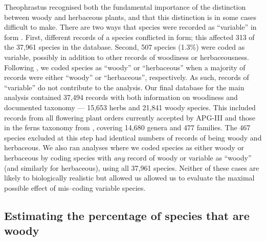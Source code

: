 \documentclass[a4paper,12pt]{article}
\begin{document}
Theophrastus recognised both the fundamental importance of the
distinction between woody and herbaceous plants, and that this
distinction is in some cases difficult to make.  There are two ways
that species were recorded as ``variable'' in form
\citep{beaulieuHiddenRates}.  First, different records of a species
conflicted in form; this affected 313 of the 37,961 species in the
database.
Second, 507 species (1.3\%) were coded as variable, possibly in
addition to other records of woodiness or herbaceousness.
Following \citet{beaulieuHiddenRates}, we coded species as ``woody''
or ``herbaceous'' when a majority of records were either ``woody'' or
``herbaceous'', respectively.  As such, records of ``variable'' do not
contribute to the analysis.
%
Our final database for the main analysis contained 37,494 records with
both information on woodiness and documented taxonomy --- 15,653 herbs
and 21,841 woody species.  
This included records from all flowering plant orders currently
accepted by APG-III \citep{APG3} and those in the ferns taxonomy from
\citet{apweb}, covering 14,680 genera and 477 families.
The 467 species excluded at this step had identical numbers of records
of being woody and herbaceous.
We also ran analyses where we coded species as either woody or
herbaceous by coding species with \emph{any} record of woody or
variable as ``woody'' (and similarly for herbaceous), using all 37,961
species.  Neither of these cases are likely to biologically realistic
but allowed us allowed us to evaluate the maximal possible effect of
mis--coding variable species.

\subsection{Estimating the percentage of species that are woody}
\end{document}
